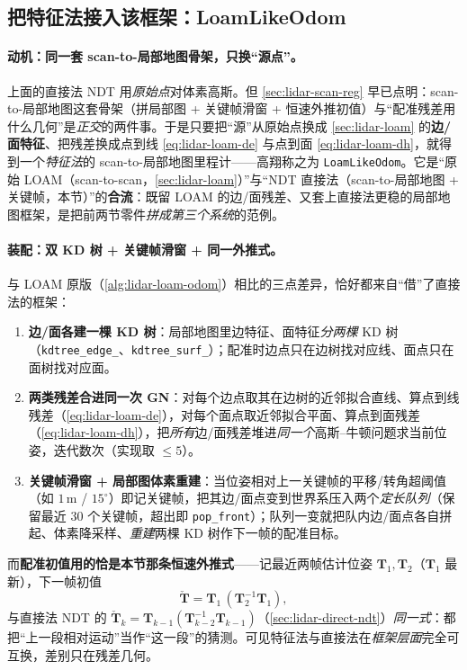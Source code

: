 \subsection{把特征法接入该框架：LoamLikeOdom}
\label{sec:lidar-loamlike}

\paragraph{动机：同一套 scan-to-局部地图骨架，只换“源点”。}
上面的直接法 NDT 用\emph{原始点}对体素高斯。但 \cref{sec:lidar-scan-reg} 早已点明：scan-to-局部地图这套骨架（拼局部图 + 关键帧滑窗 + 恒速外推初值）与“配准残差用什么几何”是\emph{正交}的两件事。于是只要把“源”从原始点换成 \cref{sec:lidar-loam} 的\textbf{边/面特征}、把残差换成点到线 \cref{eq:lidar-loam-de} 与点到面 \cref{eq:lidar-loam-dh}，就得到一个\emph{特征法}的 scan-to-局部地图里程计——高翔称之为 \texttt{LoamLikeOdom}\cite{gao2023slamad}。它是“原始 LOAM（scan-to-scan，\cref{sec:lidar-loam}）”与“NDT 直接法（scan-to-局部地图 + 关键帧，本节）”的\textbf{合流}：既留 LOAM 的边/面残差、又套上直接法更稳的局部地图框架，是把前两节零件\emph{拼成第三个系统}的范例。

\paragraph{装配：双 KD 树 + 关键帧滑窗 + 同一外推式。}
与 LOAM 原版（\cref{alg:lidar-loam-odom}）相比的三点差异，恰好都来自“借”了直接法的框架：
\begin{enumerate}
  \item \textbf{边/面各建一棵 KD 树}：局部地图里边特征、面特征\emph{分两棵} KD 树（\texttt{kdtree\_edge\_}、\texttt{kdtree\_surf\_}）；配准时边点只在边树找对应线、面点只在面树找对应面。
  \item \textbf{两类残差合进同一次 GN}：对每个边点取其在边树的近邻拟合直线、算点到线残差（\cref{eq:lidar-loam-de}），对每个面点取近邻拟合平面、算点到面残差（\cref{eq:lidar-loam-dh}），把\emph{所有}边/面残差堆进\emph{同一个}高斯--牛顿问题求当前位姿，迭代数次（实现取 $\le 5$）。
  \item \textbf{关键帧滑窗 + 局部图体素重建}：当位姿相对上一关键帧的平移/转角超阈值（如 $1$\,m / $15^\circ$）即记关键帧，把其边/面点变到世界系压入两个\emph{定长队列}（保留最近 $30$ 个关键帧，超出即 \texttt{pop\_front}）；队列一变就把队内边/面点各自拼起、体素降采样、\emph{重建}两棵 KD 树作下一帧的配准目标。
\end{enumerate}
而\textbf{配准初值用的恰是本节那条恒速外推式}——记最近两帧估计位姿 $\mathbf{T}_1,\mathbf{T}_2$（$\mathbf{T}_1$ 最新），下一帧初值
\begin{equation}
  \check{\mathbf{T}}=\mathbf{T}_1\,(\mathbf{T}_2^{-1}\mathbf{T}_1),
  \label{eq:lidar-loamlike-extrap}
\end{equation}
与直接法 NDT 的 $\check{\mathbf{T}}_k=\mathbf{T}_{k-1}(\mathbf{T}_{k-2}^{-1}\mathbf{T}_{k-1})$（\cref{sec:lidar-direct-ndt}）\emph{同一式}：都把“上一段相对运动”当作“这一段”的猜测。可见特征法与直接法在\emph{框架层面}完全可互换，差别只在残差几何。

